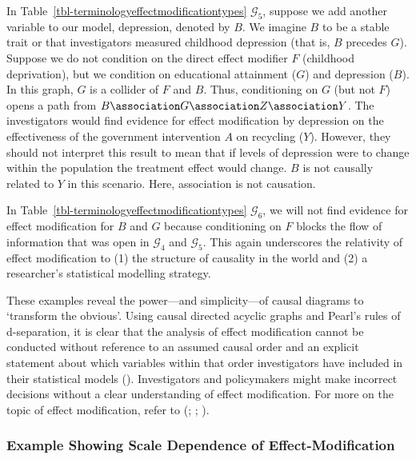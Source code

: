 \documentclass[
  single column]{article}
\begin{document}
In Table~\ref{tbl-terminologyeffectmodificationtypes} \(\mathcal{G}_5\),
suppose we add another variable to our model, depression, denoted by
\(B\). We imagine \(B\) to be a stable trait or that investigators
measured childhood depression (that is, \(B\) precedes \(G\)). Suppose
we do not condition on the direct effect modifier \(F\) (childhood
deprivation), but we condition on educational attainment (\(G\)) and
depression (\(B\)). In this graph, \(G\) is a collider of \(F\) and
\(B\). Thus, conditioning on \(G\) (but not \(F\)) opens a path from
\(B \association G \association Z \association Y\). The investigators
would find evidence for effect modification by depression on the
effectiveness of the government intervention \(A\) on recycling (\(Y\)).
However, they should not interpret this result to mean that if levels of
depression were to change within the population the treatment effect
would change. \(B\) is not causally related to \(Y\) in this scenario.
Here, association is not causation.

In Table~\ref{tbl-terminologyeffectmodificationtypes} \(\mathcal{G}_6\),
we will not find evidence for effect modification for \(B\) and \(G\)
because conditioning on \(F\) blocks the flow of information that was
open in \(\mathcal{G}_4\) and \(\mathcal{G}_5\). This again underscores
the relativity of effect modification to (1) the structure of causality
in the world and (2) a researcher's statistical modelling strategy.

These examples reveal the power---and simplicity---of causal diagrams to
`transform the obvious'. Using causal directed acyclic graphs and
Pearl's rules of d-separation, it is clear that the analysis of effect
modification cannot be conducted without reference to an assumed causal
order and an explicit statement about which variables within that order
investigators have included in their statistical models
(). Investigators and
policymakers might make incorrect decisions without a clear
understanding of effect modification. For more on the topic of effect
modification, refer to (; ;
).

\subsubsection{Example Showing Scale Dependence of
Effect-Modification}\label{example-showing-scale-dependence-of-effect-modification}
\end{document}
